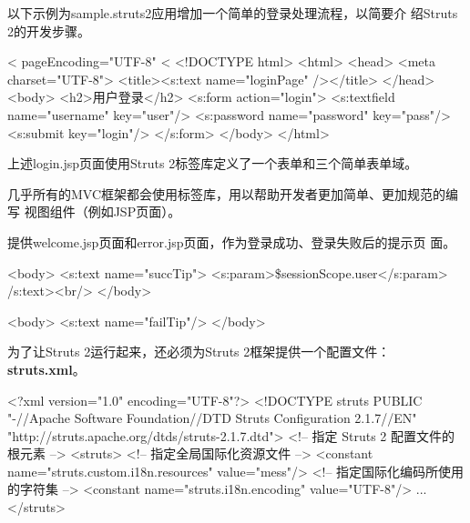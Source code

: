 以下示例为sample.struts2应用增加一个简单的登录处理流程，以简要介
绍Struts 2的开发步骤。



\begin{xmlCode}
  <%
    pageEncoding="UTF-8"%
  <%
  <!DOCTYPE html>
  <html>
  <head>
    <meta charset="UTF-8">
    <title><s:text name="loginPage" /></title>
  </head>
  <body>
    <h2>用户登录</h2>
    <s:form action="login">
      <s:textfield name="username" key="user"/>
      <s:password name="password" key="pass"/>
      <s:submit key="login"/>
    </s:form>
  </body>
  </html>  
\end{xmlCode}

上述login.jsp页面使用Struts 2标签库定义了一个表单和三个简单表单域。


几乎所有的MVC框架都会使用标签库，用以帮助开发者更加简单、更加规范的编写
视图组件（例如JSP页面）。

提供welcome.jsp页面和error.jsp页面，作为登录成功、登录失败后的提示页
面。


\begin{xmlCode}
<body>
  <s:text name="succTip">
    <s:param>\${sessionScope.user}</s:param>
  /s:text><br/>
</body>
\end{xmlCode}



\begin{xmlCode}
<body>
  <s:text name="failTip"/>
</body>
\end{xmlCode}
  
为了让Struts 2运行起来，还必须为Struts 2框架提供一个配置文件：{\bf\Red
  struts.xml}。


\begin{xmlCode}
  <?xml version="1.0" encoding="UTF-8"?>
  <!DOCTYPE struts PUBLIC
  "-//Apache Software Foundation//DTD Struts Configuration 2.1.7//EN"
  "http://struts.apache.org/dtds/struts-2.1.7.dtd">
  <!-- 指定 Struts 2 配置文件的根元素 -->
  <struts>
    <!-- 指定全局国际化资源文件 -->
    <constant name="struts.custom.i18n.resources" value="mess"/>
    <!-- 指定国际化编码所使用的字符集 -->	
    <constant name="struts.i18n.encoding" value="UTF-8"/>
    ...
  </struts>  
\end{xmlCode}

